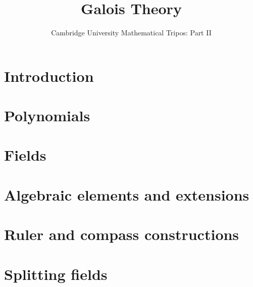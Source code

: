 \documentclass{article}
\title{Galois Theory}
\author{Cambridge University Mathematical Tripos: Part II}
\begin{document}
\maketitle

\tableofcontentsnewpage{}

\section{Introduction}

\section{Polynomials}

\section{Fields}

\section{Algebraic elements and extensions}

\section{Ruler and compass constructions}

\section{Splitting fields}

\end{document}
